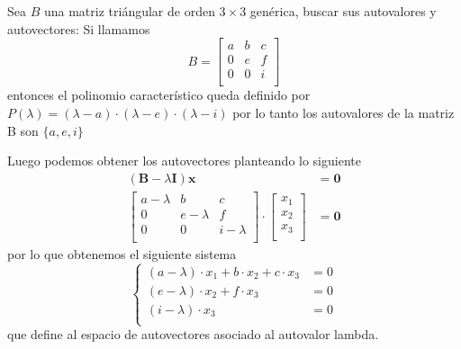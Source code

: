 \begin{example}[]
    Sea $B$ una matriz triángular de orden $3\times 3$ genérica, buscar sus
    autovalores y autovectores:
    \vspace*{5pt}
    Si llamamos
    \begin{equation*}
        B = 
        \begin{bmatrix}
        a & b & c\\
        0 & e & f\\
        0 & 0 & i\\
        \end{bmatrix}
    \end{equation*}
    entonces el polinomio característico queda definido por 
    $P(\lambda) = (\lambda - a)\cdot (\lambda - e) \cdot (\lambda - i)$ por lo tanto
    los autovalores de la matriz B son $\{a, e, i\}$

    Luego podemos obtener los autovectores planteando lo siguiente
    \begin{equation*}
        \begin{split}
            (\bm{B} - \lambda \bm{I}) \bm{x} &= \bm{0} \\
            \begin{bmatrix}
            a-\lambda & b & c\\
            0 & e-\lambda & f\\
            0 & 0 & i-\lambda\\
            \end{bmatrix} \cdot
            \begin{bmatrix}
            x_1\\
            x_2\\
            x_3\\
            \end{bmatrix} &= \bm{0}
        \end{split}
    \end{equation*}
    por lo que obtenemos el siguiente sistema
    \begin{equation}
        \begin{cases}
            (a-\lambda)\cdot x_1 + b\cdot x_2 + c \cdot x_3 &= 0\\
            (e-\lambda)\cdot x_2 + f \cdot x_3 &= 0\\
            (i-\lambda)\cdot x_3 &=0 \\
        \end{cases}
    \end{equation}
    que define al espacio de autovectores asociado al autovalor lambda.

\end{example}

